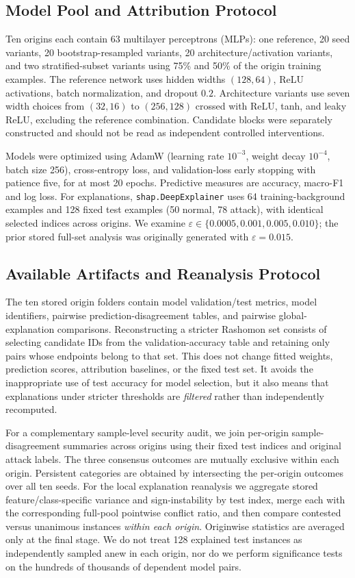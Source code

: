 \documentclass[10pt,conference]{IEEEtran}
\newcommand{\eps}{\varepsilon}
\begin{document}
\subsection{Model Pool and Attribution Protocol}
Ten origins each contain 63 multilayer perceptrons (MLPs): one reference, 20 seed variants, 20 bootstrap-resampled variants, 20 architecture/activation variants, and two stratified-subset variants using 75\% and 50\% of the origin training examples. The reference network uses hidden widths $(128,64)$, ReLU activations, batch normalization, and dropout $0.2$. Architecture variants use seven width choices from $(32,16)$ to $(256,128)$ crossed with ReLU, tanh, and leaky ReLU, excluding the reference combination. Candidate blocks were separately constructed and should not be read as independent controlled interventions.

Models were optimized using AdamW (learning rate $10^{-3}$, weight decay $10^{-4}$, batch size 256), cross-entropy loss, and validation-loss early stopping with patience five, for at most 20 epochs. Predictive measures are accuracy, macro-F1 and log loss. For explanations, \texttt{shap.DeepExplainer} uses 64 training-background examples and 128 fixed test examples (50 normal, 78 attack), with identical selected indices across origins. We examine $\eps\in\{0.0005,0.001,0.005,0.010\}$; the prior stored full-set analysis was originally generated with $\eps=0.015$.

\subsection{Available Artifacts and Reanalysis Protocol}
The ten stored origin folders contain model validation/test metrics, model identifiers, pairwise prediction-disagreement tables, and pairwise global-explanation comparisons. Reconstructing a stricter Rashomon set consists of selecting candidate IDs from the validation-accuracy table and retaining only pairs whose endpoints belong to that set. This does not change fitted weights, prediction scores, attribution baselines, or the fixed test set. It avoids the inappropriate use of test accuracy for model selection, but it also means that explanations under stricter thresholds are \emph{filtered} rather than independently recomputed.

For a complementary sample-level security audit, we join per-origin sample-disagreement summaries across origins using their fixed test indices and original attack labels. The three consensus outcomes are mutually exclusive within each origin. Persistent categories are obtained by intersecting the per-origin outcomes over all ten seeds. For the local explanation reanalysis we aggregate stored feature/class-specific variance and sign-instability by test index, merge each with the corresponding full-pool pointwise conflict ratio, and then compare contested versus unanimous instances \emph{within each origin}. Originwise statistics are averaged only at the final stage. We do not treat 128 explained test instances as independently sampled anew in each origin, nor do we perform significance tests on the hundreds of thousands of dependent model pairs.
\end{document}
